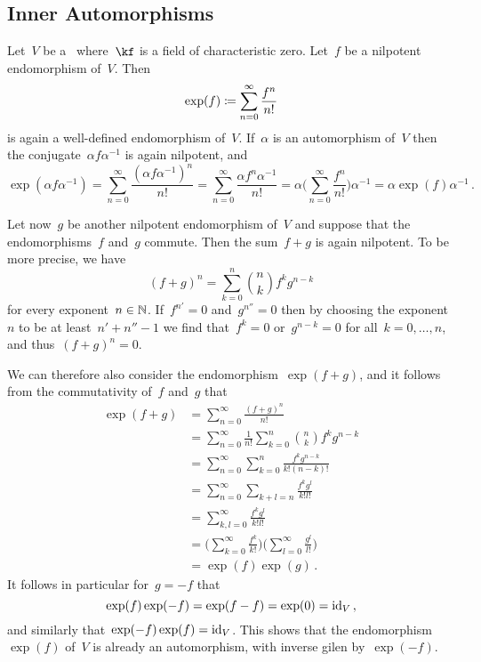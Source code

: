\subsection{Inner Automorphisms}


\begin{recall}
  Let~$V$ be a~\vectorspace{$\kf$} where~$\kf$ is a field of characteristic zero.
  Let~$f$ be a nilpotent endomorphism of~$V$.
  Then
  \[
    \exp(f)
    \coloneqq
    \sum_{n=0}^\infty
    \frac{f^n}{n!}
  \]
  is again a well-defined endomorphism of~$V$.
  If~$\alpha$ is an automorphism of~$V$ then the conjugate~$\alpha f \alpha^{-1}$ is again nilpotent, and
  \[
    \exp( \alpha f \alpha^{-1} )
    =
    \sum_{n=0}^\infty
    \frac{ (\alpha f \alpha^{-1})^n }{n!}
    =
    \sum_{n=0}^\infty
    \frac{ \alpha f^n \alpha^{-1} }{n!}
    =
    \alpha
    \Biggl(
      \sum_{n=0}^\infty
      \frac{f^n}{n!}
    \Biggr)
    \alpha^{-1}
    =
    \alpha \exp(f) \alpha^{-1} \,.
  \]

  Let now~$g$ be another nilpotent endomorphism of~$V$ and suppose that the endomorphisms~$f$ and~$g$ commute.
  Then the sum~$f + g$ is again nilpotent.
  To be more precise, we have
  \[
    (f + g)^n
    =
    \sum_{k=0}^n
    \binom{n}{k}
    f^k g^{n-k}
  \]
  for every exponent~$n \in \mathbb{N}$.
  If~$f^{n'} = 0$ and~$g^{n''} = 0$ then by choosing the exponent~$n$ to be at least~$n' + n'' - 1$ we find that~$f^k = 0$ or~$g^{n-k} = 0$ for all~$k = 0, \dotsc, n$, and thus~$(f + g)^n = 0$.

  We can therefore also consider the endomorphism~$\exp(f + g)$, and it follows from the commutativity of~$f$ and~$g$ that 
  \begingroup
  \allowdisplaybreaks
  \begin{align*}
    \exp(f + g)
    &=
    \sum_{n=0}^\infty
    \frac{(f + g)^n}{n!}
    \\
    &=
    \sum_{n=0}^\infty
    \frac{1}{n!}
    \sum_{k=0}^n
    \binom{n}{k}
    f^k g^{n-k}
    \\
    &=
    \sum_{n=0}^\infty
    \sum_{k=0}^n
    \frac{f^k g^{n-k}}{k!(n-k)!}
    \\
    &=
    \sum_{n=0}^\infty
    \sum_{k + l = n}
    \frac{f^k g^l}{k! l!}
    \\
    &=
    \sum_{k, l = 0}^\infty
    \frac{f^k g^l}{k! l!}
    \\
    &=
    \Biggl(
      \sum_{k=0}^\infty
      \frac{f^k}{k!}
    \Biggr)
    \Biggl(
      \sum_{l=0}^\infty
      \frac{g^l}{l!}
    \Biggr)
    \\
    &=
    \exp(f) \exp(g) \,.
  \end{align*}
  \endgroup
  It follows in particular for~$g = -f$ that
  \[
    \exp(f) \exp(-f) = \exp(f - f) = \exp(0) = \mathrm{id}_V \,,
  \]
  and similarly that~$\exp(-f) \exp(f) = \mathrm{id}_V$.
  This shows that the endomorphism~$\exp(f)$ of~$V$ is already an automorphism, with inverse gilen by~$\exp(-f)$.
\end{recall}


